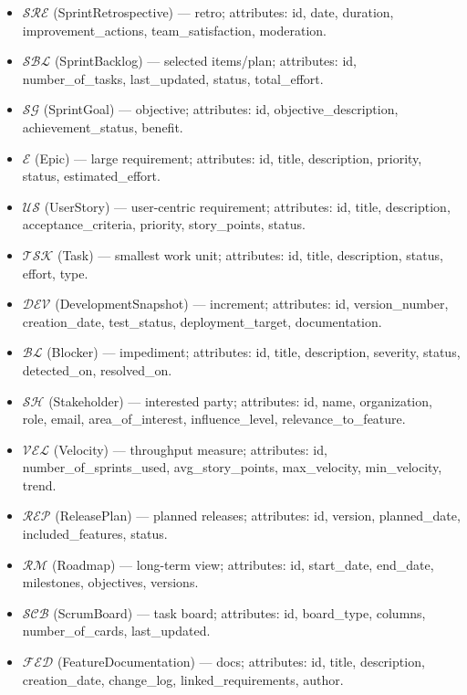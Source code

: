 \documentclass[a4paper,11pt]{article}
\begin{document}
\begin{itemize}[leftmargin=2.2em]
  \item $\mathcal{SRE}$ (SprintRetrospective) — retro; attributes: id, date, duration, improvement\_actions, team\_satisfaction, moderation.
  \item $\mathcal{SBL}$ (SprintBacklog) — selected items/plan; attributes: id, number\_of\_tasks, last\_updated, status, total\_effort.
  \item $\mathcal{SG}$ (SprintGoal) — objective; attributes: id, objective\_description, achievement\_status, benefit.
  \item $\mathcal{E}$ (Epic) — large requirement; attributes: id, title, description, priority, status, estimated\_effort.
  \item $\mathcal{US}$ (UserStory) — user-centric requirement; attributes: id, title, description, acceptance\_criteria, priority, story\_points, status.
  \item $\mathcal{TSK}$ (Task) — smallest work unit; attributes: id, title, description, status, effort, type.
  \item $\mathcal{DEV}$ (DevelopmentSnapshot) — increment; attributes: id, version\_number, creation\_date, test\_status, deployment\_target, documentation.
  \item $\mathcal{BL}$ (Blocker) — impediment; attributes: id, title, description, severity, status, detected\_on, resolved\_on.
  \item $\mathcal{SH}$ (Stakeholder) — interested party; attributes: id, name, organization, role, email, area\_of\_interest, influence\_level, relevance\_to\_feature.
  \item $\mathcal{VEL}$ (Velocity) — throughput measure; attributes: id, number\_of\_sprints\_used, avg\_story\_points, max\_velocity, min\_velocity, trend.
  \item $\mathcal{REP}$ (ReleasePlan) — planned releases; attributes: id, version, planned\_date, included\_features, status.
  \item $\mathcal{RM}$ (Roadmap) — long-term view; attributes: id, start\_date, end\_date, milestones, objectives, versions.
  \item $\mathcal{SCB}$ (ScrumBoard) — task board; attributes: id, board\_type, columns, number\_of\_cards, last\_updated.
  \item $\mathcal{FED}$ (FeatureDocumentation) — docs; attributes: id, title, description, creation\_date, change\_log, linked\_requirements, author.
\end{itemize}
\end{document}
